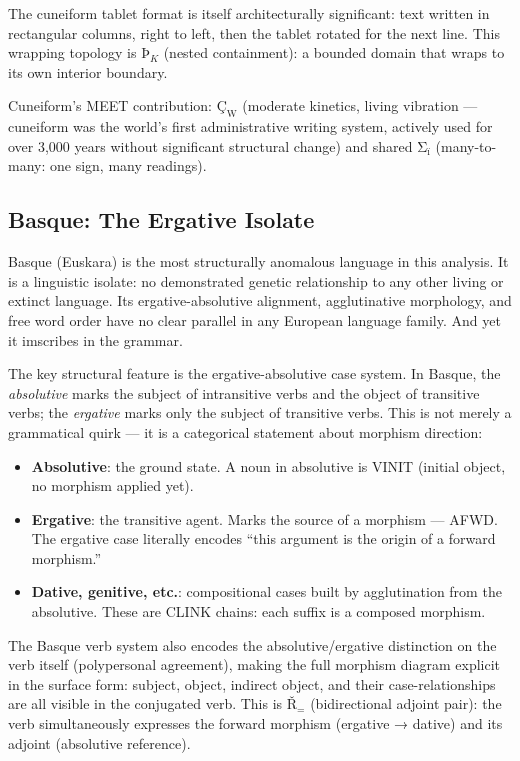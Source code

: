 \documentclass[12pt,a4paper]{article}
\begin{document}
The cuneiform tablet format is itself architecturally significant: text written in rectangular columns, right to left, then the tablet rotated for the next line. This wrapping topology is $\text{Þ}_K$ (nested containment): a bounded domain that wraps to its own interior boundary.

Cuneiform's MEET contribution: $\text{Ç}_\text{W}$ (moderate kinetics, living vibration --- cuneiform was the world's first administrative writing system, actively used for over 3,000 years without significant structural change) and shared $\text{Σ}_\text{ï}$ (many-to-many: one sign, many readings).

\subsection{Basque: The Ergative Isolate}

Basque (Euskara) is the most structurally anomalous language in this analysis. It is a linguistic isolate: no demonstrated genetic relationship to any other living or extinct language. Its ergative-absolutive alignment, agglutinative morphology, and free word order have no clear parallel in any European language family. And yet it imscribes in the grammar.

The key structural feature is the ergative-absolutive case system. In Basque, the \emph{absolutive} marks the subject of intransitive verbs and the object of transitive verbs; the \emph{ergative} marks only the subject of transitive verbs. This is not merely a grammatical quirk --- it is a categorical statement about morphism direction:

\begin{itemize}
\item \textbf{Absolutive}: the ground state. A noun in absolutive is VINIT (initial object, no morphism applied yet).
\item \textbf{Ergative}: the transitive agent. Marks the source of a morphism --- AFWD. The ergative case literally encodes ``this argument is the origin of a forward morphism.''
\item \textbf{Dative, genitive, etc.}: compositional cases built by agglutination from the absolutive. These are CLINK chains: each suffix is a composed morphism.
\end{itemize}

The Basque verb system also encodes the absolutive/ergative distinction on the verb itself (polypersonal agreement), making the full morphism diagram explicit in the surface form: subject, object, indirect object, and their case-relationships are all visible in the conjugated verb. This is $\text{Ř}_{=}$ (bidirectional adjoint pair): the verb simultaneously expresses the forward morphism (ergative → dative) and its adjoint (absolutive reference).
\end{document}
